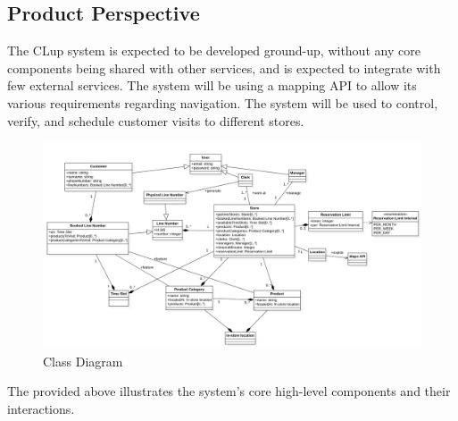 \subsection{Product Perspective}

The CLup system is expected to be developed ground-up, without any core components being shared with other services, and is expected to integrate with few external services.
The system will be using a mapping API to allow its various requirements regarding navigation.
The system will be used to control, verify, and schedule customer visits to different stores.



\begin{figure}[H]
    \centering
    \includegraphics[height=0.5\textwidth]{Images/ClassDiagram.png}
    \caption{Class Diagram}
    \label{fig:ClassDiagram}
\end{figure}
The  provided above illustrates the system's core high-level components and their interactions.


